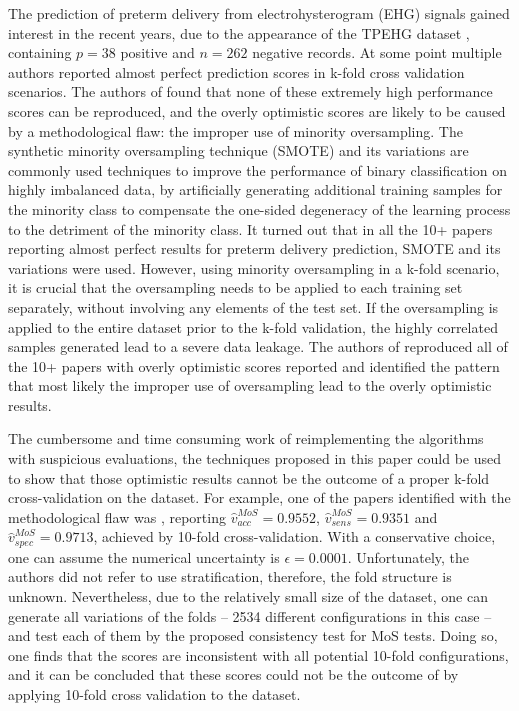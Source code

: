 \documentclass[5p, final]{elsarticle}
\begin{document}
The prediction of preterm delivery from electrohysterogram (EHG) signals \cite{ehgreview} gained interest in the recent years, due to the appearance of the TPEHG dataset \cite{tpehg}, containing $p=38$ positive and $n=262$ negative records. At some point multiple authors reported almost perfect prediction scores in k-fold cross validation scenarios. The authors of \cite{ehg} found that none of these extremely high performance scores can be reproduced, and the overly optimistic scores are likely to be caused by a methodological flaw: the improper use of minority oversampling. The synthetic minority oversampling technique (SMOTE) \cite{smote} and its variations are commonly used techniques to improve the performance of binary classification on highly imbalanced data, by artificially generating additional training samples for the minority class to compensate the one-sided degeneracy of the learning process to the detriment of the minority class. It turned out that in all the 10+ papers reporting almost perfect results for preterm delivery prediction, SMOTE and its variations were used. However, using minority oversampling in a k-fold scenario, it is crucial that the oversampling needs to be applied to each training set separately, without involving any elements of the test set. If the oversampling is applied to the entire dataset prior to the k-fold validation, the highly correlated samples generated lead to a severe data leakage. The authors of \cite{ehg} reproduced all of the 10+ papers with overly optimistic scores reported and identified the pattern that most likely the improper use of oversampling lead to the overly optimistic results.

The cumbersome and time consuming work of reimplementing the algorithms with suspicious evaluations, the techniques proposed in this paper could be used to show that those optimistic results cannot be the outcome of a proper k-fold cross-validation on the dataset. For example, one of the papers identified with the methodological flaw was \cite{ehgflaw}, reporting $\hat{v}_{acc}^{MoS} = 0.9552$, $\hat{v}_{sens}^{MoS} = 0.9351$ and $\hat{v}_{spec}^{MoS} = 0.9713$, achieved by 10-fold cross-validation. With a conservative choice, one can assume the numerical uncertainty is $\epsilon = 0.0001$. Unfortunately, the authors did not refer to use stratification, therefore, the fold structure is unknown. Nevertheless, due to the relatively small size of the dataset, one can generate all variations of the folds -- 2534 different configurations in this case -- and test each of them by the proposed consistency test for MoS tests. Doing so, one finds that the scores are inconsistent with all potential 10-fold configurations, and it can be concluded that these scores could not be the outcome of by applying 10-fold cross validation to the dataset.
\end{document}
